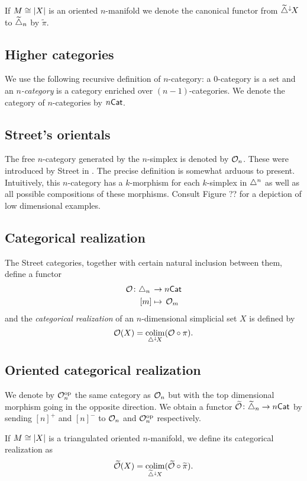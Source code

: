 If $M \cong \lvert X\rvert$ is an oriented $n$-manifold we denote the canonical functor from $\widetilde{\triangle}^\downarrow\hspace{-1pt}X$ to $\widetilde{\triangle}_n$ by $\widetilde\pi$.

\subsection{Higher categories}

We use the following recursive definition of $n$-category: a $0$-category is a set and an \textit{$n$-category} is a category enriched over $(n-1)$-categories.
We denote the category of $n$-categories by $n\mathsf{Cat}$.

\subsection{Street's orientals}

The free $n$-category generated by the $n$-simplex is denoted by $\mathcal{O}_n$.
These were introduced by Street in \cite{street1987orientals}.
The precise definition is somewhat arduous to present.
Intuitively, this $n$-category has a $k$-morphism for each $k$-simplex in $\triangle^n$ as well as all possible compositions of these morphisms.
Consult Figure ?? for a depiction of low dimensional examples.

\subsection{Categorical realization}

The Street categories, together with certain natural inclusion between them, define a functor
\[
\begin{split}
	\mathcal{O} \colon \triangle_n \, &\to n\mathsf{Cat} \\
	[m] &\mapsto \, \mathcal{O}_m
\end{split}
\]
and the \textit{categorical realization} of an $n$-dimensional simplicial set $X$ is defined by
\[
\mathcal{O}(X) = \operatorname*{colim}_{\triangle^\downarrow\hspace{-1pt}X} (\mathcal{O} \circ \pi).
\]

\subsection{Oriented categorical realization}

We denote by $\mathcal{O}_n^{\mathrm{op}}$ the same category as $\mathcal{O}_n$ but with the top dimensional morphism going in the opposite direction.
We obtain a functor $\widetilde{\mathcal{O}} \colon \widetilde{\triangle}_n \to n\mathsf{Cat}$ by sending $[n]^+$ and $[n]^-$ to $\mathcal{O}_n$ and $\mathcal{O}_n^{\mathrm{op}}$ respectively.

If $M \cong \lvert X\rvert$ is a triangulated oriented $n$-manifold, we define its categorical realization as
\[
\widetilde{\mathcal{O}}(X) = \operatorname*{colim}_{\widetilde{\triangle}^\downarrow\hspace{-1pt}X} (\widetilde{\mathcal{O}} \circ \widetilde\pi).
\]